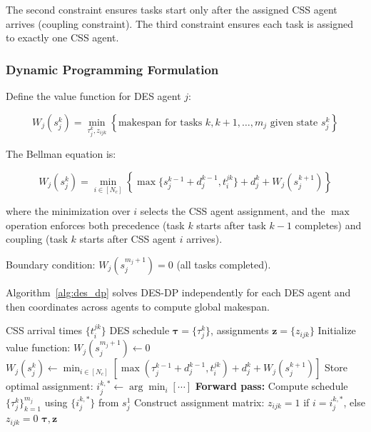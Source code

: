\documentclass[manuscript,screen,review]{acmart}
\begin{document}
The second constraint ensures tasks start only after the assigned CSS agent 
arrives (coupling constraint). The third constraint ensures each task is 
assigned to exactly one CSS agent.

\subsubsection{Dynamic Programming Formulation}

Define the value function for DES agent $j$:

\begin{equation}
W_j(s_j^k) = \min_{\tau_j^k, z_{ijk}} \left\{ \text{makespan for tasks } k, k+1, \ldots, m_j \text{ given state } s_j^k \right\}
\label{eq:des_value_function}
\end{equation}

The Bellman equation is:

\begin{equation}
W_j(s_j^k) = \min_{i \in [N_c]} \left\{ \max\{s_j^{k-1} + d_j^{k-1}, t_i^{jk}\} + d_j^k + W_j(s_j^{k+1}) \right\}
\label{eq:des_bellman}
\end{equation}

where the minimization over $i$ selects the CSS agent assignment, and the 
$\max$ operation enforces both precedence (task $k$ starts after task $k-1$ 
completes) and coupling (task $k$ starts after CSS agent $i$ arrives).

Boundary condition: $W_j(s_j^{m_j+1}) = 0$ (all tasks completed).

Algorithm~\ref{alg:des_dp} solves DES-DP independently for each DES agent 
and then coordinates across agents to compute global makespan.

\begin{algorithm}[t]
	\caption{DES-DP: Discrete Event System Dynamic Programming}
	\label{alg:des_dp}
	\small
	\begin{algorithmic}[1]
		\Require CSS arrival times $\{t_i^{jk}\}$
		\Ensure DES schedule $\boldsymbol{\tau} = \{\tau_j^k\}$, assignments $\mathbf{z} = \{z_{ijk}\}$
		\State Initialize value function: $W_j(s_j^{m_j+1}) \leftarrow 0$
		\State $W_j(s_j^k) \leftarrow \min_{i \in [N_c]} \left[ \max(\tau_j^{k-1} + d_j^{k-1}, t_i^{jk}) + d_j^k + W_j(s_j^{k+1}) \right]$
		\State Store optimal assignment: $i_j^{k,*} \leftarrow \arg\min_{i} [\cdots]$
		\EndFor
		\EndFor
		\State \textbf{Forward pass:} Compute schedule $\{\tau_j^k\}_{k=1}^{m_j}$ using $\{i_j^{k,*}\}$ from $s_j^1$
		\EndFor
		\State Construct assignment matrix: $z_{ijk} = 1$ if $i = i_j^{k,*}$, else $z_{ijk} = 0$
		\Return $\boldsymbol{\tau}, \mathbf{z}$
	\end{algorithmic}
\end{algorithm}
\end{document}
